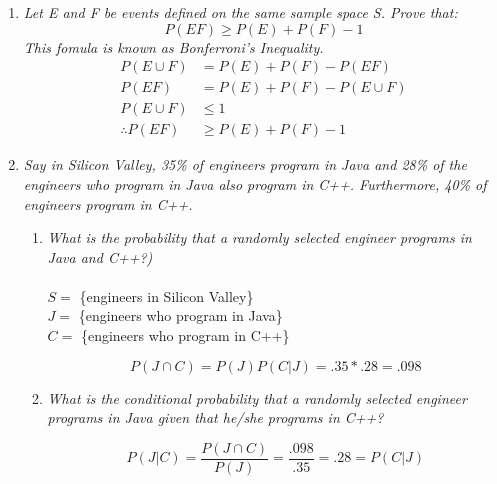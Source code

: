 \documentclass{article} %
\begin{document}
\thispagestyle{fancy} %

\begin{enumerate}
	
	\item \textit{Let E and F be events defined on the same sample space S. Prove that:
	$$P(EF) \geq P(E) + P(F) - 1$$
	This fomula is known as Bonferroni's Inequality.}
	\begin{align*}
	P(E \cup F) &= P(E) + P(F) - P(EF)\\
	P(EF) &= P(E) + P(F) - P(E \cup F)\\
	P(E \cup F) &\leq 1\\
	\therefore P(EF) &\geq P(E) + P(F) - 1
	\end{align*}
	
	\item \textit{Say in Silicon Valley, 35\% of engineers program in Java and 28\% of the engineers who program in Java also program in C++. Furthermore, 40\% of engineers program in C++.}
	\begin{enumerate}
		\item \textit{What is the probability that a randomly selected engineer programs in Java and C++?)}\\
		\\
		$S =$ \{engineers in Silicon Valley\}\\
		$J =$ \{engineers who program in Java\}\\
		$C =$ \{engineers who program in C++\}
		
		$$P(J \cap C) = P(J) P(C | J) = .35 * .28 = .098$$
		
		\item \textit{What is the conditional probability that a randomly selected engineer programs in Java given that he/she programs in C++?}
		
		$$P(J | C) = \frac{P(J \cap C)}{P(J)} = \frac{.098}{.35} = .28 = P(C | J)$$
	
	\end{enumerate}
	

\end{enumerate}
\end{document}
